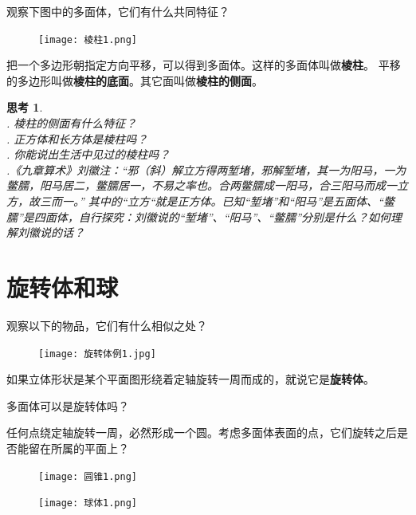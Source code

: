\documentclass[12pt,UTF8]{ctexbook}
\newtheorem{sk}{思考}[section]
\begin{document}
观察下图中的多面体，它们有什么共同特征？

\begin{figure}[h] %
    \vspace{4pt}
    \centering
    \texttt{[image: 棱柱1.png]}
\end{figure}

把一个多边形朝指定方向平移，可以得到多面体。这样的多面体叫做\textbf{棱柱}。
平移的多边形叫做\textbf{棱柱的底面}。其它面叫做\textbf{棱柱的侧面}。

\begin{sk}
    \mbox{}\\
    . 棱柱的侧面有什么特征？\\
    . 正方体和长方体是棱柱吗？\\
    . 你能说出生活中见过的棱柱吗？\\
    .《九章算术》刘徽注：“邪（斜）解立方得两堑堵，邪解堑堵，其一为阳马，一为鳖臑，阳马居二，鳖臑居一，不易之率也。合两鳖臑成一阳马，合三阳马而成一立方，故三而一。”
    其中的“立方“就是正方体。已知“堑堵”和“阳马”是五面体、“鳖臑”是四面体，自行探究：刘徽说的“堑堵”、“阳马”、“鳖臑”分别是什么？如何理解刘徽说的话？
\end{sk}

\section{旋转体和球}

观察以下的物品，它们有什么相似之处？

\begin{figure}[h] %
    \vspace{4pt}
    \centering
    \texttt{[image: 旋转体例1.jpg]}
\end{figure}

如果立体形状是某个平面图形绕着定轴旋转一周而成的，就说它是\textbf{旋转体}。

多面体可以是旋转体吗？

任何点绕定轴旋转一周，必然形成一个圆。考虑多面体表面的点，它们旋转之后是否能留在所属的平面上？

\begin{figure} %
    \vspace{-10pt}
    \flushright
    \texttt{[image: 圆锥1.png]}

    \vspace{20pt}
    \texttt{[image: 球体1.png]}
\end{figure}
\end{document}
